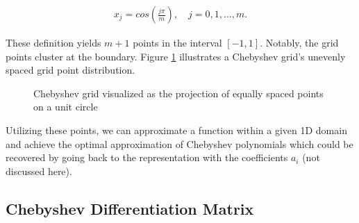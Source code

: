 \begin{align}
x_j = cos(\frac{j \pi}{m}), \quad j=0, 1,...,m.
\label{eq:cheb_nodes1d}
\end{align}

These definition yields $m+1$ points in the interval $[-1, 1]$. Notably, the
grid points cluster at the boundary. Figure \ref{fig:cheb_grid1d} illustrates a
Chebyshev grid's unevenly spaced grid point distribution.

\begin{figure}[h]
  \centering


  \caption{Chebyshev grid visualized as the projection of equally spaced
    points on a unit circle}
  \label{fig:cheb_grid1d}
\end{figure}

Utilizing these points, we can approximate a function within a given 1D domain
and achieve the optimal approximation of Chebyshev polynomials which could be
recovered by going back to the representation with the coefficients $a_i$ (not
discussed here).

\subsection{Chebyshev Differentiation Matrix}

